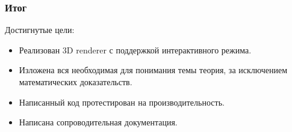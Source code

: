 \documentclass{beamer}
\begin{document}
\begin{frame}
\frametitle{Итог}

Достигнутые цели:
\begin{itemize}
	\item Реализован 3D renderer с поддержкой интерактивного режима. \pause
	\item Изложена вся необходимая для понимания темы теория, за исключением математических доказательств. \pause
	\item Написанный код протестирован на производительность. \pause
	\item Написана сопроводительная документация.
\end{itemize}
\end{frame}
\end{document}
